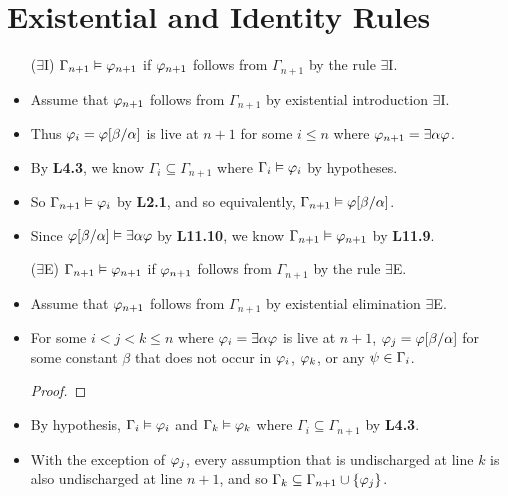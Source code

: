 \documentclass[a4paper, 11pt]{article} %
\begin{document}
\section*{Existential and Identity Rules}%
  \label{sec:ExistentialRules}
  
\begin{itemize}
  \item[($\exists$I)] $\Gamma_{n+1} \vDash \varphi_{n+1}$ if $\varphi_{n+1}$ follows from $\Gamma_{n+1}$ by the rule $\exists$I. 
    \item Assume that $\varphi_{n+1}$ follows from $\Gamma_{n+1}$ by existential introduction $\exists$I.
    \item Thus $\varphi_i=\varphi[\beta/\alpha]$ is live at $n+1$ for some $i\leq n$ where $\varphi_{n+1}=\exists \alpha\varphi$.
    \item By \textbf{L4.3}, we know $\Gamma_i\subseteq \Gamma_{n+1}$ where $\Gamma_i\vDash\varphi_i$ by hypotheses.
    \item So $\Gamma_{n+1} \vDash \varphi_i$ by \textbf{L2.1}, and so equivalently, $\Gamma_{n+1} \vDash \varphi[\beta/\alpha]$.
    \item Since $\varphi[\beta/\alpha] \vDash \exists \alpha\varphi$ by \textbf{L11.10}, we know $\Gamma_{n+1}\vDash\varphi_{n+1}$ by \textbf{L11.9}.
  \item[($\exists$E)] $\Gamma_{n+1} \vDash \varphi_{n+1}$ if $\varphi_{n+1}$ follows from $\Gamma_{n+1}$ by the rule $\exists$E.
    \item Assume that $\varphi_{n+1}$ follows from $\Gamma_{n+1}$ by existential elimination $\exists$E.
    \item For some $i<j<k\leq n$ where $\varphi_i=\exists \alpha\varphi$ is live at $n+1$, $\varphi_j=\varphi[\beta/\alpha]$ for some constant $\beta$ that does not occur in $\varphi_i$, $\varphi_k$, or any $\psi\in\Gamma_i$.
      \begin{proof}
        \open	
           
        \close
         
      \end{proof}
    \item By hypothesis, $\Gamma_i\vDash\varphi_i$ and $\Gamma_k\vDash\varphi_k$ where $\Gamma_i\subseteq \Gamma_{n+1}$ by \textbf{L4.3}.
    \item With the exception of $\varphi_j$, every assumption that is undischarged at line $k$ is also undischarged at line $n+1$, and so $\Gamma_k\subseteq\Gamma_{n+1}\cup\lbrace\varphi_j\rbrace$.

\end{itemize}
\end{document}
